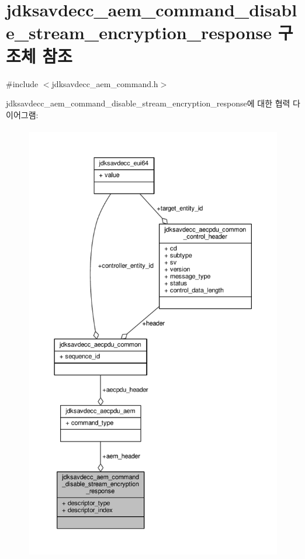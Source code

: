 \hypertarget{structjdksavdecc__aem__command__disable__stream__encryption__response}{}\section{jdksavdecc\+\_\+aem\+\_\+command\+\_\+disable\+\_\+stream\+\_\+encryption\+\_\+response 구조체 참조}
\label{structjdksavdecc__aem__command__disable__stream__encryption__response}


{\ttfamily \#include $<$jdksavdecc\+\_\+aem\+\_\+command.\+h$>$}



jdksavdecc\+\_\+aem\+\_\+command\+\_\+disable\+\_\+stream\+\_\+encryption\+\_\+response에 대한 협력 다이어그램\+:
\nopagebreak
\begin{figure}[H]
\begin{center}
\leavevmode
\includegraphics[height=550pt]{structjdksavdecc__aem__command__disable__stream__encryption__response__coll__graph}
\end{center}
\end{figure}
